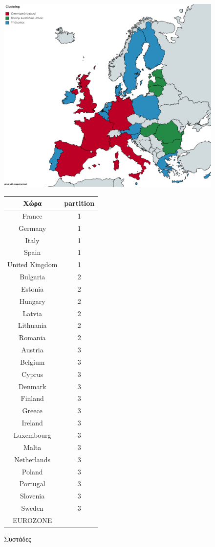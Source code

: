 \documentclass[a4paper,twoside,10pt]{article}
\begin{document}
\begin{figure}[H]
\centering
\includegraphics[width=0.65\linewidth]{images/Clustering}
\qquad
\begin{tabular}[b]{|cc|}
		\hline
Χώρα & partition \\
\hline
\rowcolor[rgb]{0.9,0.9,1} France &   1 \\
\rowcolor[rgb]{0.9,0.9,1}Germany &   1 \\
\rowcolor[rgb]{0.9,0.9,1}Italy &   1 \\
\rowcolor[rgb]{0.9,0.9,1}Spain &   1 \\ 
United Kingdom &   1 \\ \hline
Bulgaria &   2 \\
\rowcolor[rgb]{0.9,0.9,1}Estonia &   2 \\
Hungary &   2 \\
\rowcolor[rgb]{0.9,0.9,1}Latvia &   2 \\
\rowcolor[rgb]{0.9,0.9,1}Lithuania &   2 \\
Romania &   2 \\ \hline \hline
\rowcolor[rgb]{0.9,0.9,1}Austria &   3 \\
\rowcolor[rgb]{0.9,0.9,1}Belgium &   3 \\
\rowcolor[rgb]{0.9,0.9,1}Cyprus &   3 \\
Denmark &   3 \\
\rowcolor[rgb]{0.9,0.9,1}Finland &   3 \\
\rowcolor[rgb]{0.9,0.9,1}Greece &   3 \\ 
\rowcolor[rgb]{0.9,0.9,1}Ireland &   3 \\
\rowcolor[rgb]{0.9,0.9,1}Luxembourg &   3 \\
Malta &   3 \\
\rowcolor[rgb]{0.9,0.9,1}Netherlands &   3 \\
Poland &   3 \\
\rowcolor[rgb]{0.9,0.9,1}Portugal &   3 \\
\rowcolor[rgb]{0.9,0.9,1}Slovenia &   3 \\
Sweden &   3 \\
\hline
\rowcolor[rgb]{0.9,0.9,1} EUROZONE &\\
\hline
\end{tabular}
\caption{Συστάδες}
\end{figure}
\end{document}
